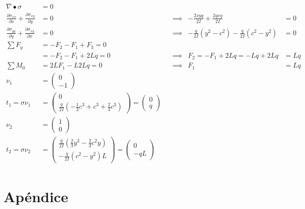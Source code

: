 \documentclass[a4paper,10pt,twoside,final,spanish]{article}
\begin{document}
\begin{align*}
\nabla\bullet\sigma &= 0 \\
\frac{\partial\sigma_{xx}}{\partial x}+\frac{\partial\sigma_{xy}}{\partial y} &= 0 
&& \implies & -\frac{2xyq}{2I}+\frac{2qxy}{2I} &= 0 \\
\frac{\partial\sigma_{yy}}{\partial y}+\frac{\partial\sigma_{xy}}{\partial x} &= 0 
&& \implies & -\frac{q}{2I}(y^{2}-c^{2})-\frac{q}{2I}(c^{2}-y^{2}) &= 0 \\
\sum F_{y} &= -F_{2}-F_{1}+F_{3}=0 \\
&= -F_{2}-F_{1}+2Lq=0 && \implies & F_{2}=-F_{1}+2Lq=-Lq+2Lq &= Lq \\
\sum M_{0} &= 2LF_{1}-L2Lq=0 && \implies & F_{1} &= Lq \\
\nu_{1} &= \begin{pmatrix}
0 \\
-1
\end{pmatrix} \\
t_{1}=\sigma\nu_{1} &= \begin{pmatrix}
0 \\
\frac{q}{2I}\left(-\frac{1}{3}c^{3}+c^{3}+\frac{2}{3}c^{3}\right)
\end{pmatrix}
=\begin{pmatrix}
0 \\
q
\end{pmatrix} \\
\nu_{2} &= \begin{pmatrix}
1 \\
0
\end{pmatrix} \\
t_{2}=\sigma\nu_{2} &= \begin{pmatrix}
\frac{q}{2I}\left(\frac{2}{3}y^{3}-\frac{2}{3}c^{2}y\right) \\
-\frac{q}{2I}\left(c^{2}-y^{2}\right)L
\end{pmatrix}
=\begin{pmatrix}
0 \\
-qL
\end{pmatrix} \\
\end{align*}

\section*{Apéndice}
\end{document}
